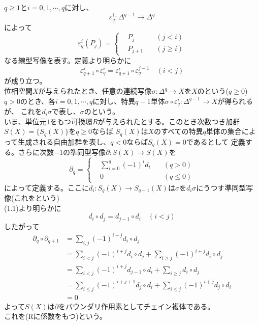 \documentclass[dvipdfmx,a4paper,11pt]{jsarticle}
\begin{document}
$q\geq 1$と$i=0,1,\cdots,q$に対し、
\begin{equation*}
  \varepsilon^{i}_{q}:\Delta^{q-1}\to \Delta^{q}
\end{equation*}
によって
\begin{equation*}
  \varepsilon^{i}_{q}(P_{j})=\left\{
    \begin{alignedat}{2}
      &P_{j}\quad &(j<i)\\
      &P_{j+1}\quad &(j\geq i)
    \end{alignedat}
  \right.
\end{equation*}
なる線型写像を表す。定義より明らかに
\begin{equation}
  \varepsilon^{j}_{q+1} \circ \varepsilon^{i}_{q}=\varepsilon^{i}_{q+1}\circ \varepsilon^{j-1}_{q}\quad (i<j)
\end{equation}
が成り立つ。\\
位相空間$X$が与えられたとき、任意の連続写像$\sigma : \Delta^{q}\to X$を$X$のという($q\geq 0$)
$q>0$のとき、各$i=0,1,\cdots,q$に対し、特異$q-1$単体$\sigma \circ \varepsilon^{i}_{q} : \Delta^{q-1}\to X$が得られるが、
これを$d_{i}\sigma$で表し、$\sigma$のという。\\
いま、単位元$1$をもつ可換環$R$が与えられたとする。このとき次数つき加群$S(X)=\{S_{q}(X)\}$を$q\geq 0$ならば
$S_{q}(X)$は$X$のすべての特異$q$単体の集合によって生成される自由加群を表し、$q<0$ならば$S_{q}(X)=0$であるとして
定義する。さらに次数$-1$の準同型写像$\partial : S(X)\to S(X)$を
\begin{equation*}
  \partial_{q}=\left\{
  \begin{alignedat}{2}
    &\sum_{i=0}^{q}(-1)^{i}d_{i}\quad &(q>0)\\
    &0 \quad &(q\leq 0)
  \end{alignedat}
  \right.
\end{equation*}
によって定義する。ここに$d_{i}:S_{q}(X)\to S_{q-1}(X)$は$\sigma$を$d_{i}\sigma$にうつす準同型写像(これをという)\\
(1.1)より明らかに
\begin{equation}
  d_{i}\circ d_{j}=d_{j-1}\circ d_{i}\quad (i<j)
\end{equation}
したがって
\begin{align*}
  \partial_{q}\circ \partial_{q+1}
  &=\sum_{i,j}(-1)^{i+j}d_{i}\circ d_{j}\\
  &=\sum_{i<j}(-1)^{i+j}d_{i}\circ d_{j} + \sum_{i\geq j}(-1)^{i+j}d_{i}\circ d_{j}\\
  &=\sum_{i<j}(-1)^{i+j}d_{j-1}\circ d_{i} + \sum_{i\geq j}d_{i}\circ d_{j}\\
  &=\sum_{i\leq j}(-1)^{i+j+1}d_{j}\circ d_{i} + \sum_{i\leq j}(-1)^{i+j}d_{j}\circ d_{i}\\
  &=0
\end{align*}
よって$S(X)$は$\partial$をバウンダリ作用素としてチェイン複体である。\\
これを(Rに係数をもつ)という。
\end{document}

